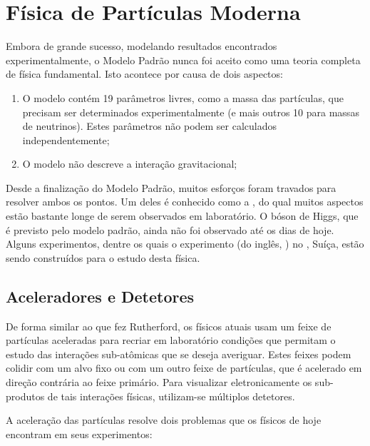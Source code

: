 \section{Física de Partículas Moderna}

Embora de grande sucesso, modelando resultados encontrados
ex\-pe\-ri\-men\-tal\-men\-te, o Modelo Pa\-drão nunca foi aceito como uma
teoria completa de física fundamental. Isto acontece por causa de dois
aspectos:

\begin{enumerate}
\item O modelo contém 19 parâmetros livres, como a massa das partículas, que
  precisam ser determinados experimentalmente (e mais outros 10 para massas de
  neutrinos). Estes parâmetros não podem ser calculados independentemente;

\item O modelo não descreve a interação gravitacional;
\end{enumerate}

Desde a finalização do Modelo Padrão, muitos esforços foram travados para
resolver ambos os pontos. Um deles é conhecido como a ,
do qual muitos aspectos estão bastante longe de serem observados em
laboratório. O bóson de Higgs, que é previsto pelo
modelo padrão, ainda não foi observado até os dias de hoje. Alguns
experimentos, dentre os quais o experimento  (do inglês, ) no , Suíça, estão sendo construídos para o
estudo desta física.

\subsection{Aceleradores e Detetores}

De forma similar ao que fez Rutherford, os físicos atuais usam um feixe de
partículas aceleradas para recriar em laboratório condições que permitam o
estudo das interações sub-atômicas que se deseja averiguar. Estes feixes podem
colidir com um alvo fixo ou com um outro feixe de partículas, que é acelerado
em direção contrária ao feixe primário. Para visualizar eletronicamente os
sub-produtos de tais interações físicas, utilizam-se múltiplos detetores.

A aceleração das partículas resolve dois problemas que os físicos de hoje
encontram em seus experimentos:

